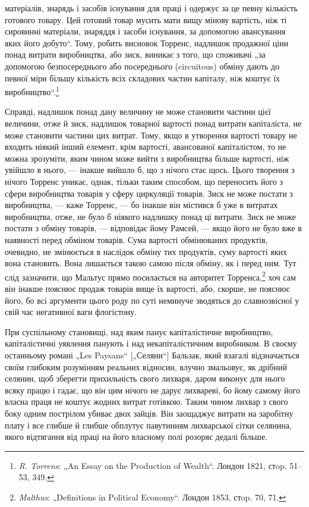 \parcont{}  %
матеріалів, знарядь і засобів існування для праці і одержує за
це певну кількість готового товару. Цей готовий товар мусить
мати вищу мінову вартість, ніж ті сировинні матеріали, знаряддя
і засоби існування, за допомогою авансування яких його
добуто“. Тому, робить висновок Торренс, надлишок продажної ціни
понад витрати виробництва, або зиск, виникає з того, що споживачі
„за допомогою безпосереднього або посереднього (circuitous)
обміну дають до певної міри більшу кількість всіх складових
частин капіталу, ніж коштує їх виробництво“.\footnote{
\emph{R. Torrens}: „An Essay on the Production of Wealth“. Лондон 1821, стop.
51--53, 349.
}

Справді, надлишок понад дану величину не може становити
частини цієї величини, отже й зиск, надлишок товарної вартості
понад витрати капіталіста, не може становити частини цих витрат.
Тому, якщо в утворення вартості товару не входить
ніякий інший елемент, крім вартості, авансованої капіталістом,
то не можна зрозуміти, яким чином може вийти з виробництва
більше вартості, ніж увійшло в нього, — інакше вийшло б, що
з нічого стає щось. Цього творення з нічого Торренс уникає,
однак, тільки таким способом, що переносить його з сфери виробництва
товарів у сферу циркуляції товарів. Зиск не може постати
з виробництва, — каже Торренс, — бо інакше він містився б уже
в витратах виробництва, отже, не було б ніякого надлишку понад
ці витрати. Зиск не може постати з обміну товарів, — відповідає
йому Рамсей, — якщо його не було вже в наявності перед обміном
товарів. Сума вартості обмінюваних продуктів, очевидно,
не змінюється в наслідок обміну тих продуктів, суму вартості
яких вона становить. Вона лишається такою самою після обміну,
як і перед ним. Тут слід зазначити, що Мальтус прямо посилається
на авторитет Торренса,\footnote{
\emph{Malthus}: „Definitions in Political Economy“. Лондон 1853, стop. 70, 71.
} хоч сам він інакше пояснює
продаж товарів вище їх вартості, або, скорше, не пояснює його,
бо всі аргументи цього роду по суті неминуче зводяться до
славнозвісної у свій час негативної ваги флогістону.

При суспільному становищі, над яким панує капіталістичне виробництво,
капіталістичні уявлення панують і над некапіталістичним
виробником. В своєму останньому романі „Les Paysans“
[„Селяни“] Бальзак, який взагалі відзначається своїм глибоким
розумінням реальних відносин, влучно змальовує, як дрібний
селянин, щоб зберегти прихильність свого лихваря, даром виконує
для нього всяку працю і гадає, що він цим нічого не
дарує лихвареві, бо йому самому його власна праця не коштує
жодних витрат готівкою. Таким чином лихвар з свого боку
одним пострілом убиває двох зайців. Він заощаджує витрати
на заробітну плату і все глибше й глибше обплутує павутинням
лихварської сітки селянина, якого відтягання від праці на його
власному полі розоряє дедалі більше.
